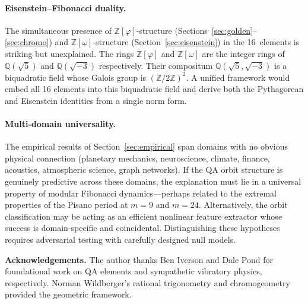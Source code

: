 \documentclass[11pt]{article}
\newcommand{\Zphi}{\mathbb{Z}[\varphi]}
\begin{document}
\paragraph{Eisenstein--Fibonacci duality.}
The simultaneous presence of $\Zphi$-structure (Sections~\ref{sec:golden}--\ref{sec:chromo}) and $\mathbb{Z}[\omega]$-structure (Section~\ref{sec:eisenstein}) in the 16~elements is striking but unexplained.  The rings $\Zphi$ and $\mathbb{Z}[\omega]$ are the integer rings of $\mathbb{Q}(\sqrt{5})$ and $\mathbb{Q}(\sqrt{-3})$ respectively.  Their compositum $\mathbb{Q}(\sqrt{5}, \sqrt{-3})$ is a biquadratic field whose Galois group is $(\mathbb{Z}/2\mathbb{Z})^2$.  A unified framework would embed all 16 elements into this biquadratic field and derive both the Pythagorean and Eisenstein identities from a single norm form.

\paragraph{Multi-domain universality.}
The empirical results of Section~\ref{sec:empirical} span domains with no obvious physical connection (planetary mechanics, neuroscience, climate, finance, acoustics, atmospheric science, graph networks).  If the QA orbit structure is genuinely predictive across these domains, the explanation must lie in a universal property of modular Fibonacci dynamics---perhaps related to the extremal properties of the Pisano period at $m=9$ and $m=24$.  Alternatively, the orbit classification may be acting as an efficient nonlinear feature extractor whose success is domain-specific and coincidental.  Distinguishing these hypotheses requires adversarial testing with carefully designed null models.

\bigskip

\noindent\textbf{Acknowledgements.}  The author thanks Ben Iverson and Dale Pond for foundational work on QA elements and sympathetic vibratory physics, respectively.  Norman Wildberger's rational trigonometry and chromogeometry provided the geometric framework.
\end{document}
